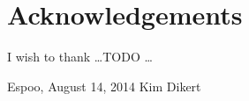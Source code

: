 \documentclass[12pt,a4paper,oneside,pdftex]{report}
\newcommand{\DATE}{August 14, 2014}
\newcommand{\AUTHOR}{Kim Dikert}
\begin{document}
\chapter*{Acknowledgements}

I wish to thank \ldots TODO \ldots


\vskip 10mm

\noindent Espoo, \DATE
\vskip 5mm
\noindent\AUTHOR


% 


\cleardoublepage
\tableofcontents

\cleardoublepage
\listoftables


\label{pages-prelude}
\cleardoublepage

\startfirstchapter

\pagestyle{headings}
\end{document}
